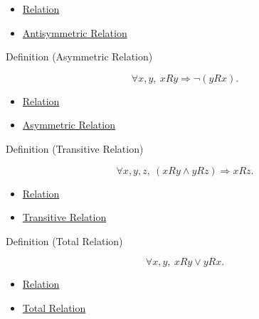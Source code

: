 \begin{dependencies}
\begin{itemize}
  \item \hyperref[def:relation]{Relation}
  \item \hyperref[def:antisymmetric]{Antisymmetric Relation}
\end{itemize}
\end{dependencies}

\begin{definitionbox}{Definition (Asymmetric Relation)}
\begin{definition}
\label{def:asymmetric-relation}
\[
\forall x,y,\ xRy \Longrightarrow \neg(yRx).
\]
\end{definition}
\end{definitionbox}

\begin{dependencies}
\begin{itemize}
  \item \hyperref[def:relation]{Relation}
  \item \hyperref[def:asymmetric]{Asymmetric Relation}
\end{itemize}
\end{dependencies}

\begin{definitionbox}{Definition (Transitive Relation)}
\begin{definition}
\label{def:transitive-relation}
\[
\forall x,y,z,\ (xRy\land yRz)\Longrightarrow xRz.
\]
\end{definition}
\end{definitionbox}

\begin{dependencies}
\begin{itemize}
  \item \hyperref[def:relation]{Relation}
  \item \hyperref[def:transitive]{Transitive Relation}
\end{itemize}
\end{dependencies}

\begin{definitionbox}{Definition (Total Relation)}
\begin{definition}
\label{def:total-relation}
\[
\forall x,y,\ xRy\lor yRx.
\]
\end{definition}
\end{definitionbox}

\begin{dependencies}
\begin{itemize}
  \item \hyperref[def:relation]{Relation}
  \item \hyperref[def:total-rel]{Total Relation}
\end{itemize}
\end{dependencies}

